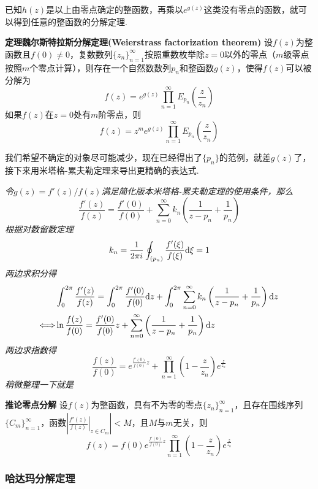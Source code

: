 \documentclass[UTF8]{ctexart}
\newcommand{\trm}[1]{{\rm #1}}
\newenvironment{theorem}[1]
    {\begin{tcolorbox}[enhanced, colback=LightYellow, breakable=true, frame hidden, borderline west={1.5mm}{-2mm}{DarkBlue}]
    {\bfseries {\color{DarkBlue} 定理}\quad #1} \newline}
    {\end{tcolorbox}}
\newenvironment{corollary}[1]
    {\begin{tcolorbox}[enhanced, colback=LightYellow, breakable=true, frame hidden, borderline west={1.5mm}{-2mm}{Brown}]
    {\bfseries {\color{Brown} 推论}\quad #1} \newline}
    {\end{tcolorbox}}
\begin{document}
已知\(h(z)\)是以上由零点确定的整函数，再乘以\(e^{g(z)}\)这类没有零点的函数，就可以得到任意的整函数的分解定理.

\begin{theorem}{魏尔斯特拉斯分解定理(Weierstrass factorization theorem)}
    设\(f(z)\)为整函数且\(f(0)\neq 0\)，复数数列\(\{z_n\}_{n=1}^{\infty}\)按照重数枚举除\(z=0\)以外的零点（\(m\)级零点按照\(m\)个零点计算），则存在一个自然数数列\(p_n\)和整函数\(g(z)\)，使得\(f(z)\)可以被分解为
    \[f(z) = e^{g(z)}\prod_{n=1}^{\infty}E_{p_n}\left(\frac{z}{z_n}\right)\]
    如果\(f(z)\)在\(z=0\)处有\(m\)阶零点，则
    \[f(z) = z^me^{g(z)}\prod_{n=1}^{\infty}E_{p_n}\left(\frac{z}{z_n}\right)\]
\end{theorem}

我们希望不确定的对象尽可能减少，现在已经得出了\(\{p_n\}\)的范例，就差\(g(z)\)了，接下来用米塔格-累夫勒定理来导出更精确的表达式.

\textit{
    令\(g(z)=f'(z)/f(z)\)满足简化版本米塔格-累夫勒定理的使用条件，那么
    \[\frac{f'(z)}{f(z)} = \frac{f'(0)}{f(0)} + \sum_{n=0}^{\infty}k_n\left(\frac{1}{z-p_n}+\frac{1}{p_n}\right)\]
    根据对数留数定理
    \[k_n = \frac{1}{2 \pi i}\oint_{(p_n)}\frac{f'(\xi)}{f(\xi)}\trm{d}\xi = 1\]
    两边求积分得
    \begin{align*}
        & \int_{0}^{2\pi}\frac{f'(z)}{f(z)} = \int_{0}^{2\pi}\frac{f'(0)}{f(0)}\trm{d}z + \int_{0}^{2\pi}\sum_{n=0}^{\infty}k_n\left(\frac{1}{z-p_n}+\frac{1}{p_n}\right)\trm{d}z \\
        \Longleftrightarrow & \ln\frac{f(z)}{f(0)} = \frac{f'(0)}{f(0)}z + \sum_{n=0}^{\infty}\left(\frac{1}{z-p_n}+\frac{1}{p_n}\right)\trm{d}z
    \end{align*}
    两边求指数得
    \[\frac{f(z)}{f(0)}=e^{\frac{f'(0)}{f(0)}z}+\prod_{n=1}^{\infty}\left(1-\frac{z}{z_n}\right)e^{\frac{z}{z_n}}\]
    稍微整理一下就是
}

\begin{corollary}{零点分解}
    设\(f(z)\)为整函数，具有不为零的零点\(\{z_n\}_{n=1}^{\infty}\)，且存在围线序列\(\{C_m\}_{n=1}^{\infty}\)，函数\(\displaystyle{\left|\left.\frac{f'(z)}{f(z)}\right|_{z \in C_m}\right| < M}\)，且\(M\)与\(m\)无关，则
    \[\boxed{f(z) = f(0)e^{\frac{f'(0)}{f(0)}z}\prod_{n=1}^{\infty}\left(1-\frac{z}{z_n}\right)e^{\frac{z}{z_n}}}\]
\end{corollary}

\subsubsection{哈达玛分解定理}
\end{document}
